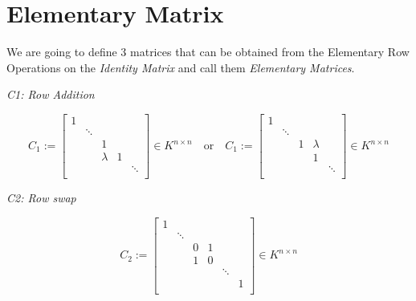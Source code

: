 \newpage
\section{Elementary Matrix}

We are going to define 3 matrices that can be obtained from the Elementary Row
Operations on the \emph{Identity Matrix} and call them \emph{Elementary Matrices}.

\emph{C1: Row Addition}

\[
       C_1 := 
       \begin{bmatrix}
       1      &        &        &        &        \\
              & \ddots &        &        &        \\
              &        & 1      &        &        \\
              &        & \lambda & 1     &        \\
              &        &        &        & \ddots \\
       \end{bmatrix}
       \in K^{n \times n}
       \quad \text{or} \quad
       C_1 := 
       \begin{bmatrix}
       1      &        &        &        &        \\
              & \ddots &        &        &        \\
              &        & 1      & \lambda &        \\
              &        &        & 1      &        \\
              &        &        &        & \ddots \\
       \end{bmatrix}
       \in K^{n \times n}
\]

\emph{C2: Row swap}

\[
       C_2 := 
       \begin{bmatrix}
       1      &        &        &        &         &    \\
              & \ddots &        &        &         &    \\
              &        & 0      & 1      &         &    \\
              &        & 1      & 0      &         &    \\
              &        &        &        & \ddots  &    \\
              &        &        &        &         & 1  \\

       \end{bmatrix}
       \in K^{n \times n}
\]

